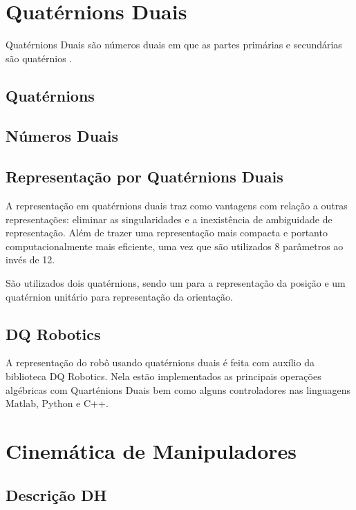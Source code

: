 \section{Quatérnions Duais}

Quatérnions Duais são números duais em que as partes primárias e secundárias são quatérnios \cite{nobody}.

\subsection{Quatérnions}
%
\subsection{Números Duais}

\subsection{Representação por Quatérnions Duais}


A representação em quatérnions duais traz como vantagens com relação a outras representações: eliminar as singularidades e a inexistência de ambiguidade de representação. Além de trazer uma representação mais compacta e portanto computacionalmente mais eficiente, uma vez que são utilizados 8 parâmetros ao invés de 12. %

São utilizados dois quatérnions, sendo um para a representação da posição e um quatérnion unitário para representação da orientação.

\subsection{DQ Robotics}

A representação do robô usando quatérnions duais é feita com auxílio da biblioteca DQ Robotics. Nela estão implementados as principais operações algébricas com Quarténions Duais bem como alguns controladores nas linguagens Matlab, Python e C++.

\section{Cinemática de Manipuladores}

\subsection{Descrição DH}

